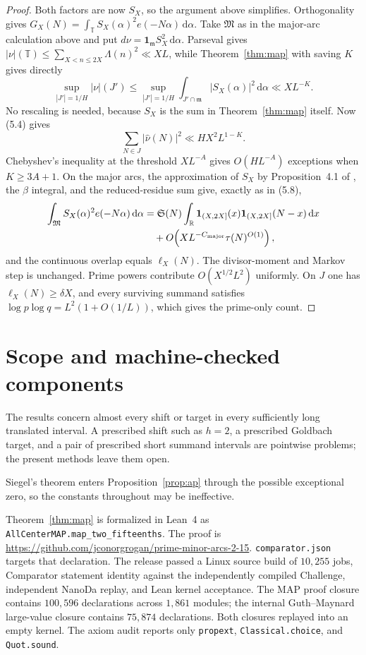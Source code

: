 \documentclass[11pt]{article}
\theoremstyle{remark}
\newcommand{\T}{\mathbb T}
\newcommand{\M}{\mathfrak M}
\newcommand{\m}{\mathfrak m}
\newcommand{\Sg}{\mathfrak S}
\newcommand{\1}{\mathbf 1}
\newcommand{\dd}{\,\mathrm d}
\begin{document}
\begin{proof}
Both factors are now $S_X$, so the argument above simplifies.  Orthogonality
gives $G_X(N)=\int_\T S_X(\alpha)^2e(-N\alpha)\dd\alpha$.  Take $\M$ as in
the major-arc calculation above and put $d\nu=\1_\m S_X^2\dd\alpha$.
Parseval gives $|\nu|(\T)\le\sum_{X<n\le2X}\Lambda(n)^2\ll XL$, while
Theorem~\ref{thm:map} with saving $K$ gives directly
\[
 \sup_{|J'|=1/H}|\nu|(J')
 \le\sup_{|J'|=1/H}\int_{J'\cap\m}|S_X(\alpha)|^2\dd\alpha
 \ll XL^{-K}.
\]
No rescaling is needed, because $S_X$ is the sum in Theorem~\ref{thm:map}
itself.  Now (5.4) gives
\[
 \sum_{N\in J}|\widehat\nu(N)|^2\ll HX^2L^{1-K}.
\]
Chebyshev's inequality at the threshold $XL^{-A}$ gives $O(HL^{-A})$
exceptions when $K\ge3A+1$.
On the major arcs, the approximation of $S_X$ by
Proposition~4.1 of \cite{MRT2019}, the $\beta$ integral, and the
reduced-residue sum give, exactly as in (5.8),
\[
 \begin{aligned}
 \int_\M S_X(\alpha)^2e(-N\alpha)\dd\alpha
 &=\Sg(N)\int_{\mathbb R}\1_{(X,2X]}(x)\1_{(X,2X]}(N-x)\dd x\\
 &\quad+O\!\left(XL^{-C_{\rm major}}\tau(N)^{O(1)}\right),
 \end{aligned}
\]
and the continuous overlap equals $\ell_X(N)$.  The divisor-moment and
Markov step is unchanged.  Prime powers contribute $O(X^{1/2}L^2)$
uniformly.  On $J$ one has $\ell_X(N)\ge\delta X$, and every surviving
summand satisfies $\log p\log q=L^2(1+O(1/L))$, which gives the prime-only
count.
\end{proof}

\section*{Scope and machine-checked components}
The results concern almost every shift or target in every sufficiently long
translated interval.  A prescribed shift such as $h=2$, a prescribed
Goldbach target, and a pair of prescribed short summand intervals are
pointwise problems; the present methods leave them open.

Siegel's theorem enters Proposition~\ref{prop:ap} through the possible
exceptional zero, so the constants throughout may be ineffective.

Theorem~\ref{thm:map} is formalized in Lean~4 as
\texttt{AllCenterMAP.map\_two\_fifteenths}.  The proof is
\url{https://github.com/jconorgrogan/prime-minor-arcs-2-15}.
\texttt{comparator.json} targets that declaration.  The release passed a
Linux source build of $10{,}255$ jobs, Comparator statement identity against
the independently compiled Challenge, independent NanoDa replay, and Lean
kernel acceptance.  The MAP proof closure contains $100{,}596$ declarations
across $1{,}861$ modules; the internal Guth--Maynard large-value closure
contains $75{,}874$ declarations.  Both closures replayed into an empty
kernel.  The axiom audit reports only \texttt{propext},
\texttt{Classical.choice}, and \texttt{Quot.sound}.
\end{document}
